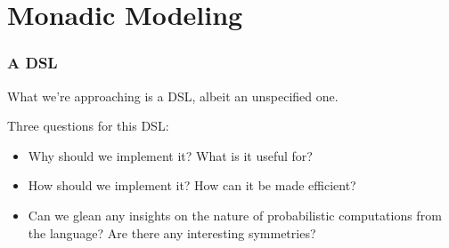 \documentclass[usenames,dvipsnames]{beamer}
\begin{document}
\section{Monadic Modeling}
\begin{frame}
  \frametitle{A DSL}
  What we're approaching is a DSL, albeit an unspecified one.

  Three questions for this DSL:
  \begin{itemize}
    \item Why should we implement it? What is it useful for?
    \item How should we implement it? How can it be made efficient? 
    \item Can we glean any insights on the nature of probabilistic computations
      from the language? Are there any interesting symmetries?
  \end{itemize}
\end{frame}
\end{document}
